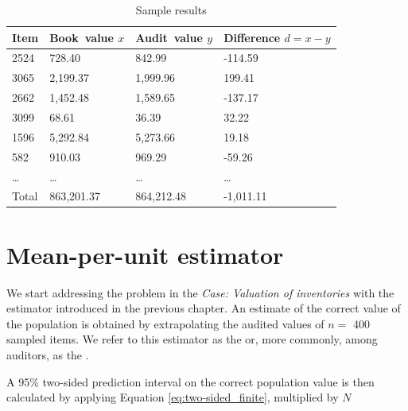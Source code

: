\begin{table}[htbp]
\begin{tabularx}{\textwidth}{X Y Y Y}
\toprule
\parbox[t]{1.1 cm}{Item} &
Book~value $x$ &
Audit~value $y$ &
Difference $d = x - y$ \\

\midrule

2524 &   728.40 &   842.99 & -114.59 \\
3065 & 2,199.37 & 1,999.96 &  199.41 \\
2662 & 1,452.48 & 1,589.65 & -137.17 \\
3099 &    68.61 &    36.39 &   32.22 \\
1596 & 5,292.84 & 5,273.66 &   19.18 \\
 582 &   910.03 &   969.29 &  -59.26 \\
\ldots & \ldots & \ldots   &  \ldots \\
\midrule
Total & 863,201.37 & 864,212.48 & -1,011.11 \\
\bottomrule
\end{tabularx}

\caption{Sample results}
\label{tab:sample_results}
\end{table}

\section{Mean-per-unit estimator} %
\label{sec:mpu_estimator}

We start addressing the problem in the \emph{Case: Valuation of inventories} with the estimator introduced in the previous chapter. An estimate of the correct value of the population is obtained by extrapolating the audited values of $n = $ 400 sampled items. We refer to this estimator as the  or, more commonly, among auditors, as the .



A 95\% two-sided prediction interval on the correct population value is then calculated by applying Equation \ref{eq:two-sided_finite}, multiplied by $N$

